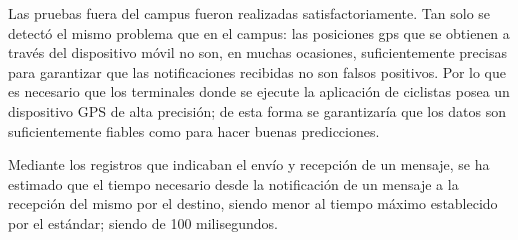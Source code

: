 Las pruebas fuera del campus fueron realizadas satisfactoriamente. Tan solo se detectó el mismo problema que en el campus: las posiciones \gls{gps} que se obtienen a través del dispositivo móvil no son, en muchas ocasiones, suficientemente precisas para garantizar que las notificaciones recibidas no son falsos positivos. Por lo que es necesario que los terminales donde se ejecute la aplicación de ciclistas posea un dispositivo GPS de alta precisión; de esta forma se garantizaría que los datos son suficientemente fiables como para hacer buenas predicciones.

Mediante los registros que indicaban el envío y recepción de un mensaje, se ha estimado que el tiempo necesario desde la notificación de un mensaje a la recepción del mismo por el destino, siendo menor al tiempo máximo establecido por el estándar; siendo de 100 milisegundos.